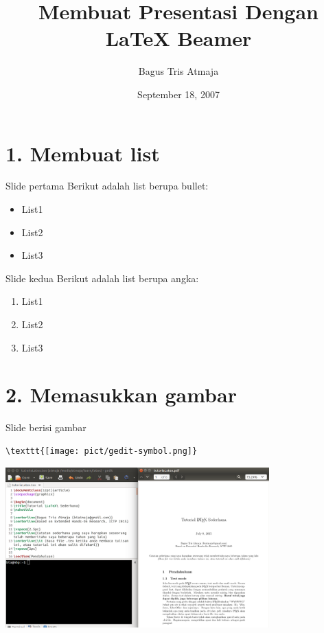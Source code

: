\documentclass{beamer}
\author{Bagus Tris Atmaja}
\title{Membuat Presentasi Dengan \LaTeX{} Beamer}
\institute{Institut Teknologi Sepuluh Nopember}
\date{September 18, 2007}
\begin{document}
\begin{frame}[t,plain]
\titlepage
\end{frame}

	
\section {1. Membuat list}
\begin{frame}[t, fragile]{Slide pertama}
Berikut adalah list berupa bullet:
\begin{itemize}
\item List1
\item List2
\item List3
\end{itemize}
\end{frame}


\begin{frame}[t, fragile]{Slide kedua}
Berikut adalah list berupa angka:
\begin{enumerate}
\item List1
\item List2
\item List3
\end{enumerate}
\end{frame}

\section{2. Memasukkan gambar}
\begin{frame}[t, fragile]{Slide berisi gambar}
\begin{verbatim}
\texttt{[image: pict/gedit-symbol.png]}
\end{verbatim}
\includegraphics[width=4in]{pict/gedit-latex.png}
\end{frame}
\end{document}
